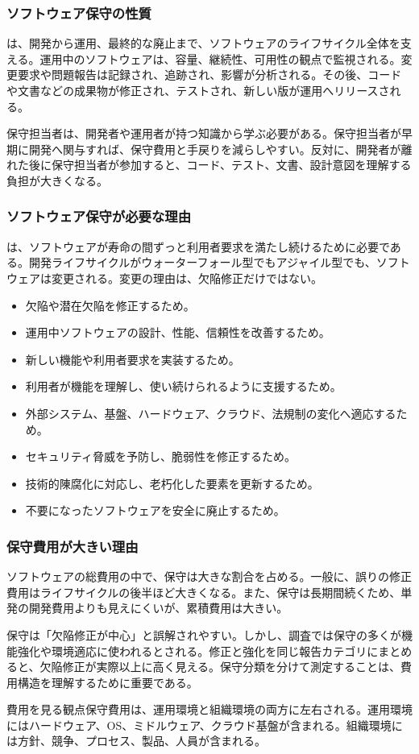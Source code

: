 \documentclass[a4paper,11pt]{ltjsarticle}
\numberwithin{figure}{section}
\numberwithin{table}{section}
\begin{document}
\subsubsection{ソフトウェア保守の性質}
は、開発から運用、最終的な廃止まで、ソフトウェアのライフサイクル全体を支える。運用中のソフトウェアは、容量、継続性、可用性の観点で監視される。変更要求や問題報告は記録され、追跡され、影響が分析される。その後、コードや文書などの成果物が修正され、テストされ、新しい版が運用へリリースされる。\par
保守担当者は、開発者や運用者が持つ知識から学ぶ必要がある。保守担当者が早期に開発へ関与すれば、保守費用と手戻りを減らしやすい。反対に、開発者が離れた後に保守担当者が参加すると、コード、テスト、文書、設計意図を理解する負担が大きくなる。\par
\subsubsection{ソフトウェア保守が必要な理由}
は、ソフトウェアが寿命の間ずっと利用者要求を満たし続けるために必要である。開発ライフサイクルがウォーターフォール型でもアジャイル型でも、ソフトウェアは変更される。変更の理由は、欠陥修正だけではない。\par
\begin{itemize}
\item 欠陥や潜在欠陥を修正するため。
\item 運用中ソフトウェアの設計、性能、信頼性を改善するため。
\item 新しい機能や利用者要求を実装するため。
\item 利用者が機能を理解し、使い続けられるように支援するため。
\item 外部システム、基盤、ハードウェア、クラウド、法規制の変化へ適応するため。
\item セキュリティ脅威を予防し、脆弱性を修正するため。
\item 技術的陳腐化に対応し、老朽化した要素を更新するため。
\item 不要になったソフトウェアを安全に廃止するため。
\end{itemize}
\subsubsection{保守費用が大きい理由}
ソフトウェアの総費用の中で、保守は大きな割合を占める。一般に、誤りの修正費用はライフサイクルの後半ほど大きくなる。また、保守は長期間続くため、単発の開発費用よりも見えにくいが、累積費用は大きい。\par
保守は「欠陥修正が中心」と誤解されやすい。しかし、調査では保守の多くが機能強化や環境適応に使われるとされる。修正と強化を同じ報告カテゴリにまとめると、欠陥修正が実際以上に高く見える。保守分類を分けて測定することは、費用構造を理解するために重要である。\par
\begin{pointbox}{費用を見る観点}保守費用は、運用環境と組織環境の両方に左右される。運用環境にはハードウェア、OS、ミドルウェア、クラウド基盤が含まれる。組織環境には方針、競争、プロセス、製品、人員が含まれる。\end{pointbox}
\end{document}
